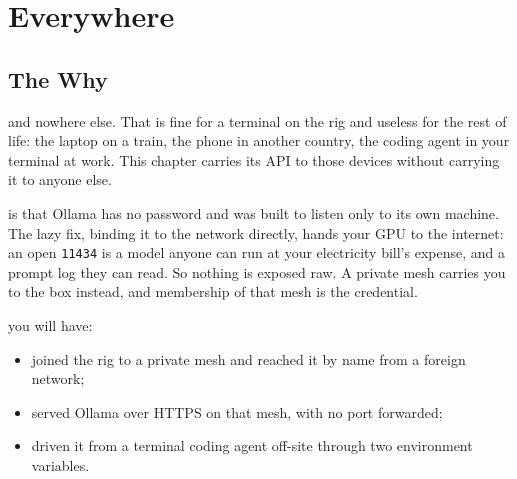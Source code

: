 
\chapter{Everywhere}
\vspace{1.5em}


\section{The Why}

 and nowhere else. That is fine
for a terminal on the rig and useless for the rest of life: the laptop on a train,
the phone in another country, the coding agent in your terminal at work. This
chapter carries its API to those devices without carrying it to anyone else.


 is that Ollama has no password and was built to
listen only to its own machine. The lazy fix, binding it to the network directly,
hands your GPU to the internet: an open \texttt{11434} is a model
anyone can run at your electricity bill's expense, and a prompt log they can read.
So nothing is exposed raw. A private mesh carries you to the box instead, and
membership of that mesh is the credential.

 you will have:
\begin{itemize}
    \item joined the rig to a private mesh and reached it by name from a foreign network;
    \item served Ollama over HTTPS on that mesh, with no port forwarded;
    \item driven it from a terminal coding agent off-site through two environment variables.
\end{itemize}


